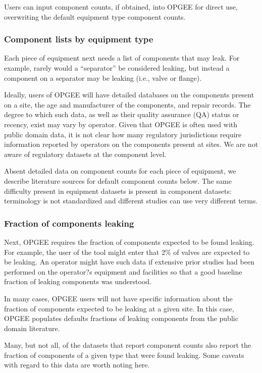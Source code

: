 \documentclass[11pt]{report}
\begin{document}
{{{{Users can input component counts, if obtained, into OPGEE for direct use, overwriting the default equipment type component counts.


\subsubsection{Component lists by equipment type}

Each piece of equipment next needs a list of components that may leak. For example, rarely would a ``separator'' be considered leaking, but instead a component on a separator may be leaking (i.e., valve or flange). 

Ideally, users of OPGEE will have detailed databases on the components present on a site, the age and manufacturer of the components, and repair records. The degree to which such data, as well as their quality assurance (QA) status or recency, exist may vary by operator. Given that OPGEE is often used with public domain data, it is not clear how many regulatory jurisdictions require information reported by operators on the components present at sites. We are not aware of regulatory datasets at the component level.

Absent detailed data on component counts for each piece of equipment, we describe literature sources for default component counts below. The same difficulty present in equipment datasets is present in component datasets: terminology is not standardized and different studies can use very different terms. 


\subsubsection{Fraction of components leaking}

Next, OPGEE requires the fraction of components expected to be found leaking. For example, the user of the tool might enter that 2\% of valves are expected to be leaking. An operator might have such data if extensive prior studies had been performed on the operator?s equipment and facilities so that a good baseline fraction of leaking components was understood.

In many cases, OPGEE users will not have specific information about the fraction of components expected to be leaking at a given site. In this case, OPGEE populates defaults fractions of leaking components from the public domain literature.

Many, but not all, of the datasets that report component counts also report the fraction of components of a given type that were found leaking. Some caveats with regard to this data are worth noting here.

}}}}
\end{document}
